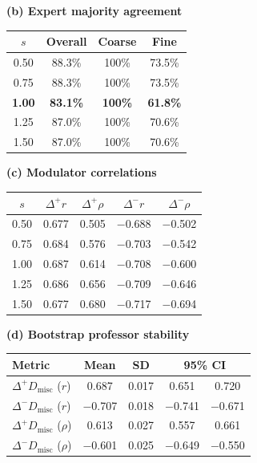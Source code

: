 \documentclass[fleqn,10pt]{JLA_article}
\begin{document}
\begin{table}[htbp]
\begin{minipage}[t]{0.56\linewidth}
    \textbf{(b) Expert majority agreement}\\[0.2em]
    \begin{tabular*}{\linewidth}{@{\extracolsep{\fill}}cccc@{}}
    \toprule
    $s$ & Overall & Coarse & Fine \\
    \midrule
    0.50 & 88.3\% & 100\% & 73.5\% \\
    0.75 & 88.3\% & 100\% & 73.5\% \\
    \textbf{1.00} & \textbf{83.1\%} & \textbf{100\%} & \textbf{61.8\%} \\
    1.25 & 87.0\% & 100\% & 70.6\% \\
    1.50 & 87.0\% & 100\% & 70.6\% \\
    \bottomrule
    \end{tabular*}
\end{minipage}\hfill
\begin{minipage}[t]{0.40\linewidth}
    \centering
    \small
    \textbf{(c) Modulator correlations}\\[0.2em]
    \setlength{\tabcolsep}{2pt}
    \begin{tabular*}{\linewidth}{@{\extracolsep{\fill}}ccccc@{}}
    \toprule
    $s$ & $\Delta^+ r$ & $\Delta^+ \rho$ & $\Delta^- r$ & $\Delta^- \rho$ \\
    \midrule
    0.50 & 0.677 & 0.505 & $-$0.688 & $-$0.502 \\
    0.75 & 0.684 & 0.576 & $-$0.703 & $-$0.542 \\
    1.00 & 0.687 & 0.614 & $-$0.708 & $-$0.600 \\
    1.25 & 0.686 & 0.656 & $-$0.709 & $-$0.646 \\
    1.50 & 0.677 & 0.680 & $-$0.717 & $-$0.694 \\
    \bottomrule
    \end{tabular*}
    \vspace{0.15em}

    \textbf{(d) Bootstrap professor stability}\\[0.2em]
    \scriptsize
    \setlength{\tabcolsep}{2pt}
    \begin{tabular*}{\linewidth}{@{\extracolsep{\fill}}lcccc@{}}
    \toprule
    \textbf{Metric} & \textbf{Mean} & \textbf{SD} & \multicolumn{2}{c}{\textbf{95\% CI}} \\
    \midrule
    $\Delta^+ D_{\text{misc}}$ ($r$) & 0.687 & 0.017 & 0.651 & 0.720 \\
    $\Delta^- D_{\text{misc}}$ ($r$) & $-$0.707 & 0.018 & $-$0.741 & $-$0.671 \\
    $\Delta^+ D_{\text{misc}}$ ($\rho$) & 0.613 & 0.027 & 0.557 & 0.661 \\
    $\Delta^- D_{\text{misc}}$ ($\rho$) & $-$0.601 & 0.025 & $-$0.649 & $-$0.550 \\
    \bottomrule
    \end{tabular*}
\end{minipage}
\end{table}
\end{document}
